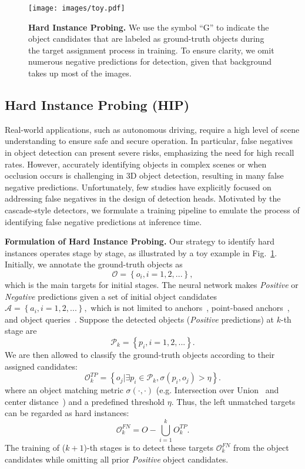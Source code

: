 \documentclass[10pt,twocolumn,letterpaper]{article}
\begin{document}
\begin{figure}[t]
	\begin{center}
		\texttt{[image: images/toy.pdf]}
	\end{center}
	\caption{\textbf{Hard Instance Probing.} We use the symbol ``G'' to indicate the object candidates that are labeled as ground-truth objects during the target assignment process in training. To ensure clarity, we omit numerous negative predictions for detection, given that background takes up most of the images.}
	\label{fig: toy example}
\end{figure}

\subsection{Hard Instance Probing (HIP)}
\label{sec:hip}
Real-world applications, such as autonomous driving, require a high level of scene understanding to ensure safe and secure operation. In particular, false negatives in object detection can present severe risks, emphasizing the need for high recall rates. However, accurately identifying objects in complex scenes or when occlusion occurs is challenging in 3D object detection, resulting in many false negative predictions. Unfortunately, few studies have explicitly focused on addressing false negatives in the design of detection heads. Motivated by the cascade-style detectors, we formulate a training pipeline to emulate the process of identifying false negative predictions at inference time.

\vspace{2mm}
\noindent\textbf{Formulation of Hard Instance Probing.}
Our strategy to identify hard instances operates stage by stage, as illustrated by a toy example in Fig.~\ref{fig: toy example}. Initially, we annotate the ground-truth objects as $$\mathcal{O} = \left\{o_i, i = 1, 2, ...\right\},$$ which is the main targets for initial stages. The neural network makes \textit{Positive} or \textit{Negative} predictions given a set of initial object candidates $\mathcal{A} = \left\{a_i, i = 1, 2, ... \right\}, $
which is not limited to anchors~\cite{fastrcnn}, point-based anchors~\cite{centerpoint}, and object queries~\cite{detr}. Suppose the detected objects (\textit{Positive} predictions) at $k$-th stage  are 
$$ \mathcal{P}_k = \left\{p_i, i = 1, 2, ...\right\}.$$ 
We are then allowed to classify the ground-truth objects according to their assigned candidates:
 $$\mathcal{O}_k^{TP} = \left\{o_j \big | \exists p_i\in \mathcal{P}_k, \sigma(p_i, o_j) > \eta \right\}.$$
where an object matching metric $\sigma(\cdot, \cdot)$ (e.g. Intersection over Union~\cite{kitti, waymo} and center distance~\cite{nuscenes}) and a predefined threshold $\eta$. Thus, the left unmatched targets can be regarded as hard instances:
$$ \mathcal{O}_k^{FN} = O - \bigcup_{i=1}^{k} O_k^{TP}. $$ 
The training of ($k+1$)-th stages is to detect these targets $\mathcal{O}_k^{FN}$ from the object candidates while omitting all prior  \textit{Positive} object candidates.
\end{document}

